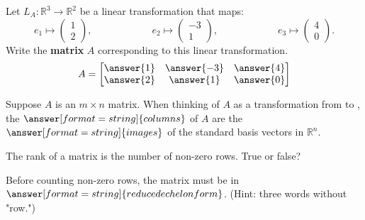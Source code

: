 \documentclass{ximera}
\begin{document}
\begin{problem}
  Let $L_A:{\mathbb R}^3\to {\mathbb R}^2$ be a linear transformation that maps:
  \[
  e_1\mapsto \begin{pmatrix} 1\\ 2 \end{pmatrix},\hspace{1in} 
  e_2\mapsto \begin{pmatrix} -3\\ 1 \end{pmatrix},\hspace{1in} 
  e_3\mapsto \begin{pmatrix} 4\\ 0 \end{pmatrix}.
        \]
        Write the \textbf{matrix} $A$ corresponding to this linear
        transformation.
  \[
  A=\begin{bmatrix} \answer{1} &  \answer{-3} &  \answer{4} \\ 
       \answer{2} &  \answer{1} &  \answer{0}\end{bmatrix}
  \]
        
\end{problem}


\begin{question}
Suppose $A$ is an $m\times n$ matrix.  When thinking of $A$ as a transformation from
 to 
, the 
$\answer[format=string]{columns}$ of $A$ are the $\answer[format=string]{images}$ of the 
standard basis vectors in ${\mathbb R}^n$. 
\end{question}

\begin{question}
The rank of a matrix is the number of non-zero rows. True or false?  
\begin{multipleChoice}
\end{multipleChoice}
\begin{question}
Before counting non-zero rows, the matrix must be in $\answer[format=string]{reduced echelon form}$. (Hint: three words without "row.")
\end{question}
\end{question}



%
%
%
\end{document}
